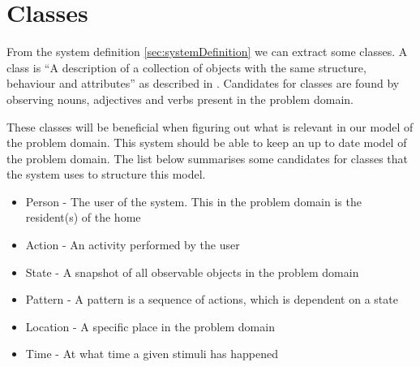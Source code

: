 \section{Classes}\label{sec:classes}
From the system definition \cref{sec:systemDefinition} we can extract some classes. A class is \enquote{A description of a collection of objects with the same structure, behaviour and attributes} as described in \cite{OOAD}. Candidates for classes are found by observing nouns, adjectives and verbs present in the problem domain.

These classes will be beneficial when figuring out what is relevant in our model of the problem domain. This system should be able to keep an up to date model of the problem domain. The list below summarises some candidates for classes that the system uses to structure this model.

\begin{itemize}
\item Person - The user of the system. This in the problem domain is the resident(s) of the home
\item Action - An activity performed by the user
\item State - A snapshot of all observable objects in the problem domain
\item Pattern - A pattern is a sequence of actions, which is dependent on a state
\item Location - A specific place in the problem domain
\item Time - At what time a given stimuli has happened
\end{itemize}
